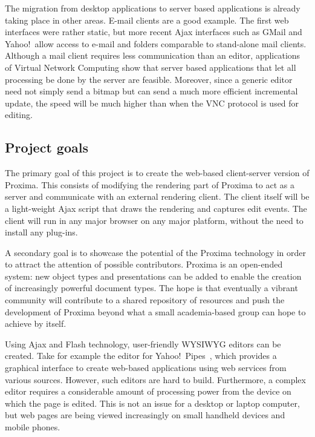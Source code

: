 \documentclass[10pt]{article}
\begin{document}
The migration from desktop applications to server based applications is already taking place in other areas. E-mail clients are a good example. The first web interfaces were rather static, but more recent Ajax interfaces such as GMail and Yahoo!\ allow access to e-mail and folders comparable to stand-alone mail clients. Although a mail client requires less communication than an editor, applications of Virtual Network Computing show that server based applications that let all processing be done by the server are feasible. Moreover, since a generic editor need not simply send a bitmap but can send a much more efficient incremental update, the speed will be much higher than when the VNC protocol is used for editing. 

\subsection{Project goals}

The primary goal of this project is to create the web-based client-server version of Proxima. This consists of modifying the rendering part of Proxima to act as a server and communicate with an external rendering client. The client itself will be a light-weight Ajax script that draws the rendering and captures edit events. The client will run in any major browser on any major platform, without the need to install any plug-ins.  

A secondary goal is to showcase the potential of the Proxima technology in order to attract the attention of possible contributors. Proxima is an open-ended system: new object types and presentations can be added to enable the creation of increasingly powerful document types. The hope is that eventually a vibrant community will contribute to a shared repository of resources and push the development of Proxima beyond what a small academia-based group can hope to achieve by itself. 


\bc

Using Ajax and Flash technology, user-friendly WYSIWYG editors can be created. Take for example the editor for Yahoo!\ Pipes~\cite{yahoo08pipes}, which provides a graphical interface to create web-based applications using web services from various sources. However, such editors are hard to build. Furthermore, a complex editor requires a considerable amount of processing power from the device on which the page is edited. This is not an issue for a desktop or laptop computer, but web pages are being viewed increasingly on small handheld devices and mobile phones. 
\end{document}
